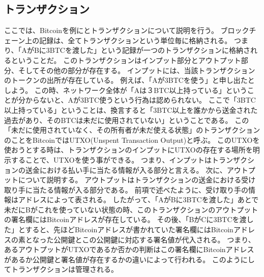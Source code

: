 \subsection{トランザクション}
ここでは、Bitcoinを例にとトランザクションについて説明を行う。
ブロックチェーン上の記録は、全てトランザクションという単位毎に格納される。
つまり、「AがBに3BTCを渡した」という記録が一つのトランザクションに格納されるということだ。
このトランザクションはインプット部分とアウトプット部分、そしてその他の部分が存在する。
インプットには、当該トランザクションのトークンの出所が存在している。
例えば、「Aが3BTCを使う」と申し出たとしよう。
この時、ネットワーク全体が「Aは３BTC以上持っている」ということが分からないと、Aが3BTC使うという行為は認められない。
ここで「3BTC以上持っている」ということは、換言すると「3BTC以上を誰かから送金された過去があり、そのBTCは未だに使用されていない」ということである。
この「未だに使用されていなく、その所有者が未だ使える状態」のトランザクションのことをBitcoinではUTXO(Unspent Transaction Output)と呼ぶ。
このUTXOを使おうとする時は、トランザクションのインプットにUTXOの存在する場所を明示することで、UTXOを使う事ができる。
つまり、インプットはトランザクションの送金における払い手に当たる情報が入る部分と言える。
次に、アウトプットについて説明する。
アウトプットはトランザクションの送金における受け取り手に当たる情報が入る部分である。
前項で述べたように、受け取り手の情報はアドレスによって表される。
したがって、「AがBに3BTCを渡した」あとで未だにBがこれを使っていない状態の時、このトランザクションのアウトプットの署名欄にはBitcoinアドレスが存在している。
その後、「BがCに3BTCを渡した」とすると、先ほどBitcoinアドレスが書かれていた署名欄にはBitcoinアドレスの素となった公開鍵とこの公開鍵に対応する署名値が代入される。
つまり、あるアウトプットがUTXOであるか否かの判断はこの署名欄にBitcoinアドレスがあるか公開鍵と署名値が存在するかの違いによって行われる。
このようにしてトランザクションは管理される。

